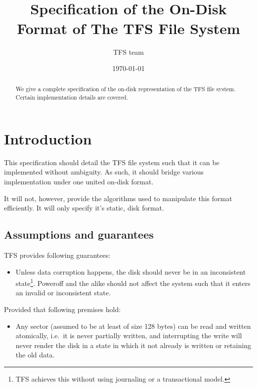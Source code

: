 \documentclass[11pt,a4paper]{report}
\title{
    \centering{}\\
    Specification of the On-Disk Format of The TFS File System
}
\author{TFS team}
\date{\today}
\newcommand{\minimumsectorsize}{128 }
\begin{document}
    \maketitle
    \begin{abstract}
        We give a complete specification of the on-disk representation of the
        TFS file system. Certain implementation details are covered.
    \end{abstract}

    \chapter{Introduction}
    This specification should detail the TFS file system such that it can be
    implemented without ambiguity. As such, it should bridge various
    implementation under one united on-disk format.

    It will not, however, provide the algorithms used to manipulate this format
    efficiently. It will only specify it's static, disk format.

    \section{Assumptions and guarantees}
    \label{assumptions_guarantees}
        TFS provides following guarantees:

        \begin{itemize}
            \item Unless data corruption happens, the disk should never be in
                an inconsistent state\footnote{TFS achieves this without using
                journaling or a transactional model.}. Poweroff and the alike
                should not affect the system such that it enters an invalid or
                inconsistent state.
        \end{itemize}

        Provided that following premises hold:

        \begin{itemize}
            \item Any sector (assumed to be at least of size \minimumsectorsize
                bytes) can be read and written atomically, i.e.\ it is never
                partially written, and interrupting the write will never render
                the disk in a state in which it not already is written or
                retaining the old data.
        \end{itemize}
\end{document}
